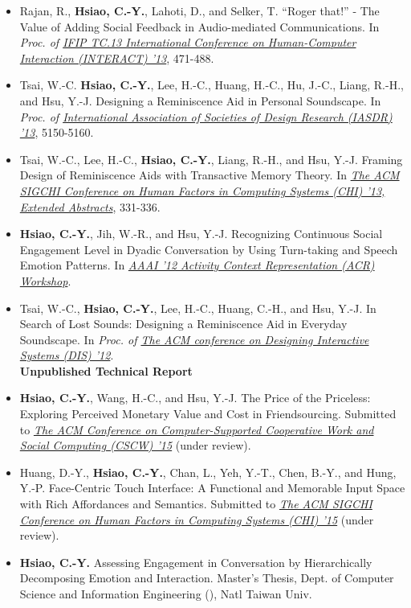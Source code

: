 \documentclass[10pt, a4paper]{article} %
\begin{document}
\begin{itemize}

\itemsep=3pt

\item Rajan, R., \textbf{Hsiao, C.-Y.}, Lahoti, D., and Selker, T. 
``Roger that!'' - The Value of Adding Social Feedback in Audio-mediated Communications. 
In \textit{Proc. of \href{http://www.interact2013.org/}{IFIP TC.13 International Conference on Human-Computer Interaction (INTERACT) '13}}, 471-488.
\item Tsai, W.-C. \textbf{Hsiao, C.-Y.}, Lee, H.-C., Huang, H.-C., Hu, J.-C., Liang, R.-H., and Hsu, Y.-J. 
Designing a Reminiscence Aid in Personal Soundscape. 
In \textit{Proc. of \href{http://www.iasdr2013.jp/}{International Association of Societies of Design Research (IASDR) '13}}, 5150-5160.
\item Tsai, W.-C., Lee, H.-C., \textbf{Hsiao, C.-Y.}, Liang, R.-H., and Hsu, Y.-J. 
Framing Design of Reminiscence Aids with Transactive Memory Theory. 
In \textit{\href{http://chi2013.acm.org/}{The ACM SIGCHI Conference on Human Factors in Computing Systems (CHI) '13, Extended Abstracts}}, 331-336.
\item \textbf{Hsiao, C.-Y.}, Jih, W.-R., and Hsu, Y.-J. 
Recognizing Continuous Social Engagement Level in Dyadic Conversation by Using Turn-taking and Speech Emotion Patterns. 
In \textit{\href{http://activitycontext.org/aaai12-archive/aaai12/}{AAAI '12 Activity Context Representation (ACR) Workshop}}.
\item Tsai, W.-C., \textbf{Hsiao, C.-Y.}, Lee, H.-C., Huang, C.-H., and Hsu, Y.-J. 
In Search of Lost Sounds: Designing a Reminiscence Aid in Everyday Soundscape. 
In \textit{Proc. of \textit{\href{http://www.dis2012.org/}{The ACM conference on Designing Interactive Systems (DIS) '12}}}. \\

\textbf{Unpublished Technical Report}
\item \textbf{Hsiao, C.-Y.}, Wang, H.-C., and Hsu, Y.-J. 
The Price of the Priceless: Exploring Perceived Monetary Value and Cost in Friendsourcing.
Submitted to \textit{\href{http://cscw.acm.org/2015/index.php}
{The ACM Conference on Computer-Supported Cooperative Work and Social Computing (CSCW) '15}} (under review).
\item Huang, D.-Y., \textbf{Hsiao, C.-Y.}, Chan, L., Yeh, Y.-T., Chen, B.-Y., and Hung, Y.-P.
Face-Centric Touch Interface: A Functional and Memorable Input Space with Rich Affordances and Semantics. 
Submitted to \textit{\href{http://chi2015.acm.org/}{The ACM SIGCHI Conference on Human Factors in Computing Systems (CHI) '15}} (under review).
\item \textbf{Hsiao, C.-Y.} Assessing Engagement in Conversation by Hierarchically Decomposing Emotion and Interaction. 
Master's Thesis, Dept. of Computer Science and Information Engineering (), Natl Taiwan Univ.

\end{itemize}
\end{document}
